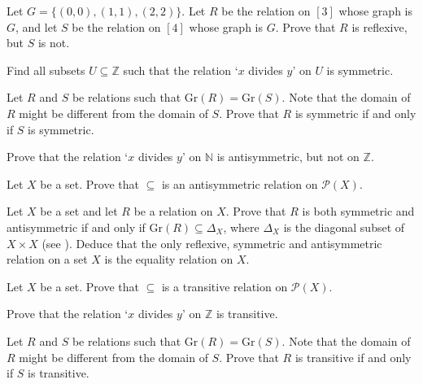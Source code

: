 \begin{exercise}
\label{exReflexivitySensitiveToDomainOfRelation}
Let $G = \{ (0,0), (1,1), (2,2) \}$. Let $R$ be the relation on $[3]$ whose graph is $G$, and let $S$ be the relation on $[4]$ whose graph is $G$. Prove that $R$ is reflexive, but $S$ is not.
\end{exercise}


\begin{exercise}
Find all subsets $U \subseteq \mathbb{Z}$ such that the relation `$x$ divides $y$' on $U$ is symmetric.
\end{exercise}

\begin{exercise}
\label{exSymmetryNotSensitiveToDomainOfRelation}
Let $R$ and $S$ be relations such that $\mathrm{Gr}(R) = \mathrm{Gr}(S)$. Note that the domain of $R$ might be different from the domain of $S$. Prove that $R$ is symmetric if and only if $S$ is symmetric.
\end{exercise}

\begin{exercise}
\label{exDivisibilityIsOrIsNotAntisymmetric}
Prove that the relation `$x$ divides $y$' on $\mathbb{N}$ is antisymmetric, but not on $\mathbb{Z}$.
\end{exercise}

\begin{exercise}
Let $X$ be a set. Prove that $\subseteq$ is an antisymmetric relation on $\mathcal{P}(X)$.
\end{exercise}

\begin{exercise}
Let $X$ be a set and let $R$ be a relation on $X$. Prove that $R$ is both symmetric and antisymmetric if and only if $\mathrm{Gr}(R) \subseteq \Delta_X$, where $\Delta_X$ is the diagonal subset of $X \times X$ (see ). Deduce that the only reflexive, symmetric and antisymmetric relation on a set $X$ is the equality relation on $X$.
\end{exercise}


\begin{exercise}
Let $X$ be a set. Prove that $\subseteq$ is a transitive relation on $\mathcal{P}(X)$.
\end{exercise}

\begin{exercise}
\label{exDivisibilityIsTransitive}
Prove that the relation `$x$ divides $y$' on $\mathbb{Z}$ is transitive.
\end{exercise}

\begin{exercise}
\label{exTransitivityNotSensitiveToDomainOfRelation}
Let $R$ and $S$ be relations such that $\mathrm{Gr}(R) = \mathrm{Gr}(S)$. Note that the domain of $R$ might be different from the domain of $S$. Prove that $R$ is transitive if and only if $S$ is transitive.
\end{exercise}

